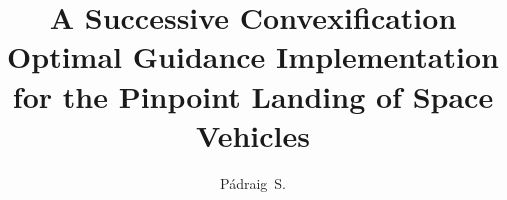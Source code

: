 \documentclass[modernstyle, 11pt]{thesis}
\title{A Successive Convexification Optimal Guidance Implementation for the Pinpoint Landing of Space Vehicles}
\author{Pádraig~S.}{Lysandrou}
\begin{document}

	





\nocite{*}						%


\appendix

% 
\end{document}
